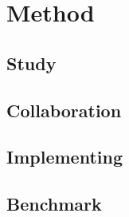 \chapter{Method}

\section{Study}

\section{Collaboration}

\section{Implementing}

\section{Benchmark}
